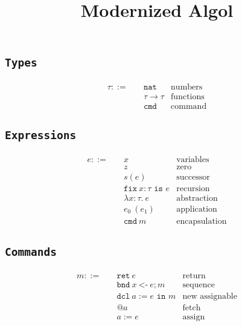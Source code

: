 \documentclass[11pt,a4paper]{article}
\title{Modernized Algol\footnotemark}
\date{}
\newcommand{\T}[1]{\texttt{#1}}
\begin{document}
\maketitle

\subsection*{\T{Types}}
\begin{align*}
  \tau ::=\quad &\T{nat}           &\text{numbers}\\
                &\tau \to \tau     &\text{functions} \\
                &\T{cmd}           &\text{command}
\end{align*}

\subsection*{\T{Expressions}}
\begin{align*}
  e ::=\quad    &x                    &\text{variables} \\
                &z                    &\text{zero}\\
                &s(e)                 &\text{successor}\\
                &\T{fix}\ x : \tau \T{ is } e &\text{recursion}\\
                &\lambda x : \tau.\ e       &\text{abstraction} \\
                &e_0\ (e_1)             &\text{application} \\
                &\T{cmd}\ m             &\text{encapsulation}
\end{align*}

\subsection*{\T{Commands}}
\begin{align*}
  m ::=\quad    &\T{ret}\ e                 &\text{return} \\
                &\T{bnd}\ x\ \T{<-}\ e; m   &\text{sequence} \\
                &\T{dcl}\ a := e \T{ in } m &\text{new assignable} \\
                &@a                         &\text{fetch} \\
                &a := e                     &\text{assign}
\end{align*}


\end{document}
